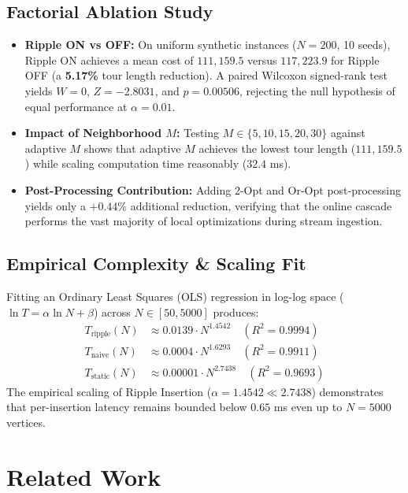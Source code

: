 \documentclass[11pt,a4paper]{article}
\theoremstyle{definition}
\begin{document}
\subsection{Factorial Ablation Study}

\begin{itemize}
    \item \textbf{Ripple ON vs OFF:} On uniform synthetic instances ($N = 200$, 10 seeds), Ripple ON achieves a mean cost of $111,159.5$ versus $117,223.9$ for Ripple OFF (a \textbf{5.17\%} tour length reduction). A paired Wilcoxon signed-rank test yields $W = 0$, $Z = -2.8031$, and $p = \mathbf{0.00506}$, rejecting the null hypothesis of equal performance at $\alpha = 0.01$.
    \item \textbf{Impact of Neighborhood $M$:} Testing $M \in \{5, 10, 15, 20, 30\}$ against adaptive $M$ shows that adaptive $M$ achieves the lowest tour length ($111,159.5$) while scaling computation time reasonably ($32.4$ ms).
    \item \textbf{Post-Processing Contribution:} Adding 2-Opt and Or-Opt post-processing yields only a $+0.44\%$ additional reduction, verifying that the online cascade performs the vast majority of local optimizations during stream ingestion.
\end{itemize}

\subsection{Empirical Complexity \& Scaling Fit}

Fitting an Ordinary Least Squares (OLS) regression in log-log space ($\ln T = \alpha \ln N + \beta$) across $N \in [50, 5000]$ produces:
\begin{align}
T_{\text{ripple}}(N) &\approx 0.0139 \cdot N^{\mathbf{1.4542}} \quad (R^2 = 0.9994) \\
T_{\text{naive}}(N)  &\approx 0.0004 \cdot N^{1.6293} \quad (R^2 = 0.9911) \\
T_{\text{static}}(N) &\approx 0.00001 \cdot N^{\mathbf{2.7438}} \quad (R^2 = 0.9693)
\end{align}
The empirical scaling of Ripple Insertion ($\alpha = 1.4542 \ll 2.7438$) demonstrates that per-insertion latency remains bounded below $0.65$ ms even up to $N = 5000$ vertices.

\section{Related Work}
\end{document}
